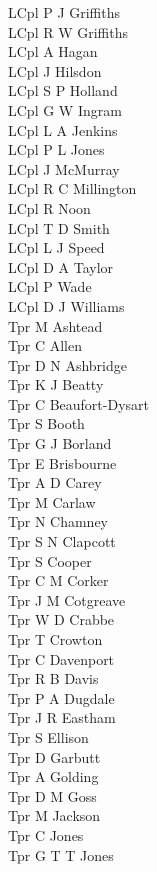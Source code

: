 \begin{multicols}{2}
  LCpl P J Griffiths \\
  LCpl R W Griffiths \\
  LCpl A Hagan \\
  LCpl J Hilsdon \\
  LCpl S P Holland \\
  LCpl G W Ingram \\
  LCpl L A Jenkins \\
  LCpl P L Jones \\
  LCpl J McMurray \\
  LCpl R C Millington \\
  LCpl R Noon \\
  LCpl T D Smith \\
  LCpl L J Speed \\
  LCpl D A Taylor \\
  LCpl P Wade \\
  LCpl D J Williams \\
  Tpr M Ashtead \\
  Tpr C Allen \\
  Tpr D N Ashbridge \\
  Tpr K J Beatty \\
  Tpr C Beaufort-Dysart \\
  Tpr S Booth \\
  Tpr G J Borland \\
  Tpr E Brisbourne \\
  Tpr A D Carey \\
  Tpr M Carlaw \\
  Tpr N Chamney \\
  Tpr S N Clapcott \\
  Tpr S Cooper \\
  Tpr C M Corker \\
  Tpr J M Cotgreave \\
  Tpr W D Crabbe \\
  Tpr T Crowton \\
  Tpr C Davenport \\
  Tpr R B Davis \\
  Tpr P A Dugdale \\
  Tpr J R Eastham \\
  Tpr S Ellison \\
  Tpr D Garbutt \\
  Tpr A Golding \\
  Tpr D M Goss \\
  Tpr M Jackson \\
  Tpr C Jones \\
  Tpr G T T Jones \\

\end{multicols}
